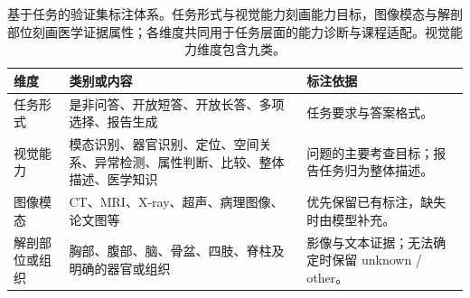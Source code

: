 \begin{table}[!htbp]
\centering\small
\caption{基于任务的验证集标注体系。任务形式与视觉能力刻画能力目标，图像模态与解剖部位刻画医学证据属性；各维度共同用于任务层面的能力诊断与课程适配。视觉能力维度包含九类。}
\label{tab:feedback_axes}
\setlength{\tabcolsep}{4pt}
\renewcommand{\arraystretch}{1.12}
\begin{tabularx}{\linewidth}{@{}lYY@{}}
\toprule
维度 & 类别或内容 & 标注依据\\
\midrule
任务形式 & 是非问答、开放短答、开放长答、多项选择、报告生成 & 任务要求与答案格式。\\
视觉能力 & 模态识别、器官识别、定位、空间关系、异常检测、属性判断、比较、整体描述、医学知识 & 问题的主要考查目标；报告任务归为整体描述。\\
图像模态 & CT、MRI、X-ray、超声、病理图像、论文图等 & 优先保留已有标注，缺失时由模型补充。\\
解剖部位或组织 & 胸部、腹部、脑、骨盆、四肢、脊柱及明确的器官或组织 & 影像与文本证据；无法确定时保留 unknown / other。\\
\bottomrule
\end{tabularx}
\end{table}
